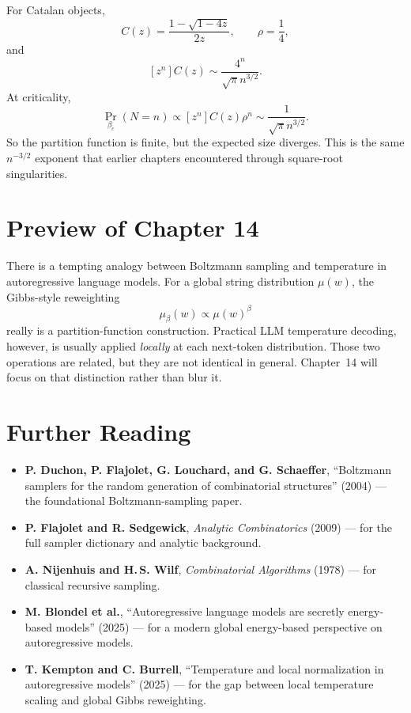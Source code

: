\begin{example}
For Catalan objects,
\[
  C(z)=\frac{1-\sqrt{1-4z}}{2z},
  \qquad \rho=\frac{1}{4},
\]
and
\[
  [z^n]C(z) \sim \frac{4^n}{\sqrt{\pi}n^{3/2}}.
\]
At criticality,
\[
  \Pr_{\beta_c}(N=n) \propto [z^n]C(z)\rho^n \sim \frac{1}{\sqrt{\pi}n^{3/2}}.
\]
So the partition function is finite, but the expected size diverges. This is the same $n^{-3/2}$ exponent that earlier chapters encountered through square-root singularities.
\end{example}

\section*{Preview of Chapter 14}

There is a tempting analogy between Boltzmann sampling and temperature in autoregressive language models. For a global string distribution $\mu(w)$, the Gibbs-style reweighting
\[
  \mu_\beta(w) \propto \mu(w)^\beta
\]
really is a partition-function construction. Practical LLM temperature decoding, however, is usually applied \emph{locally} at each next-token distribution. Those two operations are related, but they are not identical in general. Chapter~14 will focus on that distinction rather than blur it.

\section*{Further Reading}

\begin{itemize}
  \item \textbf{P. Duchon, P. Flajolet, G. Louchard, and G. Schaeffer}, ``Boltzmann samplers for the random generation of combinatorial structures'' (2004) \cite{DuchonFlajoletLouchardSchaeffer2004} --- the foundational Boltzmann-sampling paper.
  \item \textbf{P. Flajolet and R. Sedgewick}, \emph{Analytic Combinatorics} (2009) \cite{FlajoletSedgewick2009} --- for the full sampler dictionary and analytic background.
  \item \textbf{A. Nijenhuis and H.\,S. Wilf}, \emph{Combinatorial Algorithms} (1978) \cite{NijenhuisWilf1978} --- for classical recursive sampling.
  \item \textbf{M. Blondel et al.}, ``Autoregressive language models are secretly energy-based models'' (2025) \cite{BlondelEtAl2025} --- for a modern global energy-based perspective on autoregressive models.
  \item \textbf{T. Kempton and C. Burrell}, ``Temperature and local normalization in autoregressive models'' (2025) \cite{KemptonBurrell2025} --- for the gap between local temperature scaling and global Gibbs reweighting.
\end{itemize}

